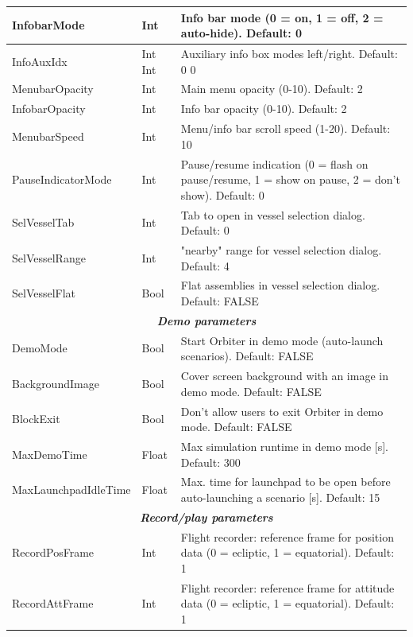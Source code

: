 \documentclass[Orbiter User Manual.tex]{subfiles}
\begin{document}
\begin{longtable}{ |p{}|p{}|p{}| }
	\hline\rule{0pt}{2ex}
	InfobarMode & Int & Info bar mode (0 = on, 1 = off, 2 = auto-hide). Default: 0\\
	\hline\rule{0pt}{2ex}
	InfoAuxIdx & Int Int & Auxiliary info box modes left/right. Default: 0 0\\
	\hline\rule{0pt}{2ex}
	MenubarOpacity & Int & Main menu opacity (0-10). Default: 2\\
	\hline\rule{0pt}{2ex}
	InfobarOpacity & Int & Info bar opacity (0-10). Default: 2\\
	\hline\rule{0pt}{2ex}
	MenubarSpeed & Int & Menu/info bar scroll speed (1-20). Default: 10\\
	\hline\rule{0pt}{2ex}
	PauseIndicatorMode & Int & Pause/resume indication (0 = flash on pause/resume, 1 = show on pause, 2 = don't show). Default: 0\\
	\hline\rule{0pt}{2ex}
	SelVesselTab & Int & Tab to open in vessel selection dialog. Default: 0\\
	\hline\rule{0pt}{2ex}
	SelVesselRange & Int & "nearby" range for vessel selection dialog. Default: 4\\
	\hline\rule{0pt}{2ex}
	SelVesselFlat & Bool & Flat assemblies in vessel selection dialog. Default: FALSE\\
	\hline
	\multicolumn{3}{|c|}{\rule{0pt}{2ex}\textbf{\textit{Demo parameters}}}\\
	\hline\rule{0pt}{2ex}
	DemoMode & Bool & Start Orbiter in demo mode (auto-launch scenarios). Default: FALSE\\
	\hline\rule{0pt}{2ex}
	BackgroundImage & Bool & Cover screen background with an image in demo mode. Default: FALSE\\
	\hline\rule{0pt}{2ex}
	BlockExit & Bool & Don't allow users to exit Orbiter in demo mode. Default: FALSE\\
	\hline\rule{0pt}{2ex}
	MaxDemoTime & Float & Max simulation runtime in demo mode [s]. Default: 300\\
	\hline\rule{0pt}{2ex}
	MaxLaunchpadIdleTime & Float & Max. time for launchpad to be open before auto-launching a scenario [s]. Default: 15\\
	\hline
	\multicolumn{3}{|c|}{\rule{0pt}{2ex}\textbf{\textit{Record/play parameters}}}\\
	\hline\rule{0pt}{2ex}
	RecordPosFrame & Int & Flight recorder: reference frame for position data (0 = ecliptic, 1 = equatorial). Default: 1\\
	\hline\rule{0pt}{2ex}
	RecordAttFrame & Int & Flight recorder: reference frame for attitude data (0 = ecliptic, 1 = equatorial). Default: 1\\

\end{longtable}
\end{document}

